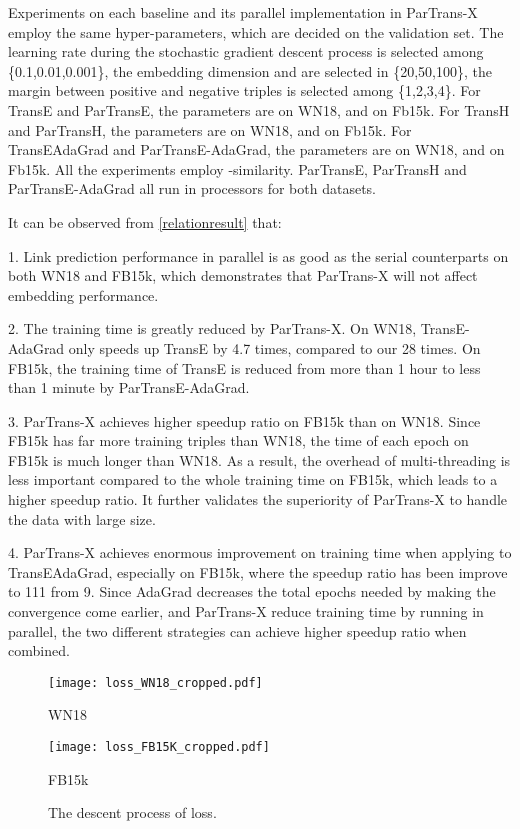 \documentclass[sigconf]{acmart}
\begin{document}
Experiments on each baseline and its parallel implementation in ParTrans-X employ the same hyper-parameters, which are decided on the validation set. The learning rate  during the stochastic gradient descent process is selected among \{0.1,0.01,0.001\}, the embedding dimension  and  are selected in \{20,50,100\}, the margin  between positive and negative triples is selected among \{1,2,3,4\}. For TransE and ParTransE, the parameters are   on WN18, and  on Fb15k. For TransH and ParTransH, the parameters are  on WN18, and  on Fb15k. For TransEAdaGrad and ParTransE-AdaGrad, the parameters are  on WN18, and  on Fb15k.
All the experiments employ -similarity. 
ParTransE, ParTransH and ParTransE-AdaGrad all run in  processors for both datasets.




It can be  observed from \tablename \ref{relationresult}  that:

1.   Link prediction performance in parallel is as good as the serial counterparts on both WN18 and FB15k, which demonstrates that ParTrans-X will not affect embedding performance.

2. The training time is greatly reduced by ParTrans-X. On WN18, TransE-AdaGrad only speeds up TransE by 4.7 times, compared to our 28 times. On FB15k, the training time of TransE is reduced from more than 1 hour to less than 1 minute by ParTransE-AdaGrad.

3.  ParTrans-X achieves higher speedup ratio on FB15k than on WN18. Since FB15k has far more training triples than WN18, the time of each epoch on FB15k is much longer than WN18.  As a result, the overhead of multi-threading is less important compared to the whole training time on FB15k,  which leads to a higher speedup ratio.
It further validates the superiority of ParTrans-X to handle the data with large size.

4. ParTrans-X achieves enormous improvement on training time when applying to TransEAdaGrad, especially on FB15k, where the speedup ratio has been improve to 111 from 9. Since AdaGrad decreases the total epochs needed by making the convergence come earlier, and ParTrans-X reduce training time by running in parallel, the two different strategies can achieve higher speedup ratio when combined.





\begin{figure}[htbp]
\begin{minipage}[t]{0.45\linewidth}
\centering
\texttt{[image: loss\_WN18\_cropped.pdf]}
\vspace{-20pt}
\caption*{WN18}
\vspace{-5pt}
\end{minipage}
\begin{minipage}[t]{0.45\linewidth}
\centering
\texttt{[image: loss\_FB15K\_cropped.pdf]}
\vspace{-20pt}
\caption*{FB15k}
\vspace{-5pt}
\end{minipage}
\caption{The descent process of loss.}
\label{losses1}
\vspace{-10pt}
\end{figure}
\end{document}
